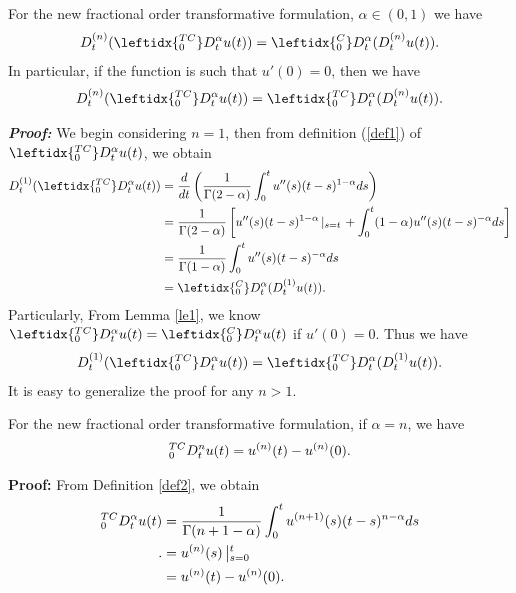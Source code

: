 \documentclass[3p,times]{elsarticle}
\begin{document}
\begin{lem}\label{le3}
For the new fractional order transformative formulation, $\alpha\in(0,1)$ we have
\begin{equation*}
\aligned
D_t^{(n)}(\leftidx{_0^{TC}}D_t^\alpha u(t))=\leftidx{_0^{C}}D_t^\alpha(D_t^{(n)}u(t)).
\endaligned
\end{equation*}
In particular, if the function is such that $u'(0)=0$, then we have
\begin{equation*}
\aligned
D_t^{(n)}(\leftidx{_0^{TC}}D_t^\alpha u(t))=\leftidx{_0^{TC}}D_t^\alpha(D_t^{(n)}u(t)).
\endaligned
\end{equation*}
\end{lem}
\textbf{\emph{Proof:}} We begin considering $n=1$, then from definition (\ref{def1}) of $\leftidx{_0^{TC}}D_t^\alpha u(t)$, we obtain
\begin{equation*}
\aligned
D_t^{(1)}(\leftidx{_0^{TC}}D_t^\alpha u(t))
&=\frac{d}{dt}\left(\frac{1}{\Gamma(2-\alpha)}\int_0^tu''(s)(t-s)^{1-\alpha}ds\right)\\
&=\frac{1}{\Gamma(2-\alpha)}\left[u''(s)(t-s)^{1-\alpha}\left|_{s=t}\right.+\int_0^t(1-\alpha)u''(s)(t-s)^{-\alpha}ds\right]\\
&=\frac{1}{\Gamma(1-\alpha)}\int_0^tu''(s)(t-s)^{-\alpha}ds\\
&=\leftidx{_0^{C}}D_t^\alpha(D_t^{(1)}u(t)).
\endaligned
\end{equation*}
Particularly, From Lemma \ref{le1}, we know $\leftidx{_0^{TC}}D_t^\alpha u(t)=\leftidx{_0^{C}}D_t^\alpha u(t)$ if $u'(0)=0$. Thus we have
\begin{equation*}
\aligned
D_t^{(1)}(\leftidx{_0^{TC}}D_t^\alpha u(t))=\leftidx{_0^{TC}}D_t^\alpha(D_t^{(1)}u(t)).
\endaligned
\end{equation*}
It is easy to generalize the proof for any $n>1$.

\begin{lem}\label{le3*}
For the new fractional order transformative formulation, if $\alpha=n$, we have
\begin{equation*}
\aligned
{_0^{TC}}D_t^nu(t)=u^{(n)}(t)-u^{(n)}(0).
\endaligned
\end{equation*}
\end{lem}
\textbf{Proof:} From Definition \ref{def2}, we obtain
\begin{equation*}
\aligned
{_0^{TC}}D_t^\alpha u(t)
&=\frac{1}{\Gamma(n+1-\alpha)}\int_0^tu^{(n+1)}(s)(t-s)^{n-\alpha}ds\\.
&=u^{(n)}(s)\left|_{s=0}^t\right.\\
&=u^{(n)}(t)-u^{(n)}(0).
\endaligned
\end{equation*}
\end{document}
